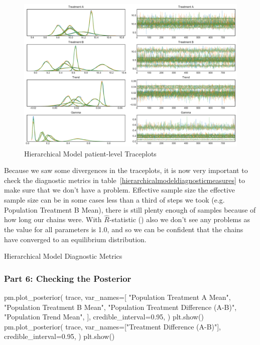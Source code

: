 \documentclass[12pt,a4paper,leqno]{report}
\theoremstyle{plain}
\theoremstyle{definition}
\theoremstyle{remark}
\begin{document}
\bigskip
\begin{figure}[H]
    \caption{Hierarchical Model patient-level Traceplots}\label{hierarchicalmodelpatienttraceplots}
    \bigskip
    \includegraphics[width=\textwidth,height=\textheight,keepaspectratio]{hierarchical_model_patient_level_traceplot.pdf}
\end{figure}
\bigskip

Because we saw some divergences in the traceplots, it is now very important to
check the diagnostic metrics in table\ \ref{hierarchicalmodeldiagnosticmeasures} to make
sure that we don't have a problem. Effective sample size  the effective
sample size can be in some cases less than a third of steps we took (e.g. Population
Treatment B Mean), there is still plenty enough of samples because of how long our chains were. With
\(\hat{R}\)-statistic () also we don't see any problems as
the value for all parameters is 1.0, and so we can be confident that the chains have converged to
an equilibrium distribution.

\bigskip
\begin{table}[H]
    \caption{Hierarchical Model Diagnostic Metrics}\label{hierarchicalmodeldiagnosticmeasures}
    \bigskip
    \centering
    \resizebox{!}{3.2in}{%
    
    }
\end{table}
\smallskip

\subsubsection*{Part 6: Checking the Posterior}

\bigskip
\begin{pyverbatim}[][fontsize=\footnotesize]
    pm.plot_posterior(
        trace,
        var_names=[
            "Population Treatment A Mean",
            "Population Treatment B Mean",
            "Population Treatment Difference (A-B)",
            "Population Trend Mean",
        ],
        credible_interval=0.95,
    )
    plt.show()
    pm.plot_posterior(
        trace,
        var_names=["Treatment Difference (A-B)"],
        credible_interval=0.95,
    )
    plt.show()
\end{pyverbatim}
\smallskip
\end{document}
